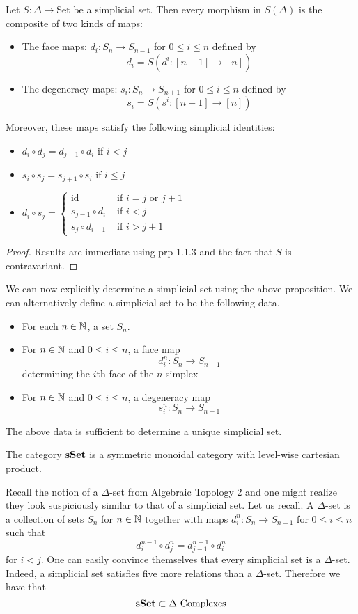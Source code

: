 \documentclass[a4paper]{article}
\begin{document}
\begin{prp}{}{} Let $S:\Delta\to\text{Set}$ be a simplicial set. Then every morphism in $S(\Delta)$ is the composite of two kinds of maps: 
\begin{itemize}
\item The face maps: $d_i:S_n\to S_{n-1}$ for $0\leq i\leq n$ defined by $$d_i=S(d^i:[n-1]\to[n])$$
\item The degeneracy maps: $s_i:S_n\to S_{n+1}$ for $0\leq i\leq n$ defined by $$s_i=S(s^i:[n+1]\to[n])$$
\end{itemize}
Moreover, these maps satisfy the following simplicial identities: 
\begin{itemize}
\item $d_i\circ d_j=d_{j-1}\circ d_i$ if $i<j$
\item $s_i\circ s_j=s_{j+1}\circ s_i$ if $i\leq j$
\item $d_i\circ s_j=\begin{cases}
\text{id} & \text{ if } i=j\text{ or }j+1\\
s_{j-1}\circ d_i & \text{ if } i<j\\
s_j\circ d_{i-1} & \text{ if }i>j+1
\end{cases}$
\end{itemize} \tcbline
\begin{proof}
Results are immediate using prp 1.1.3 and the fact that $S$ is contravariant. 
\end{proof}
\end{prp}

We can now explicitly determine a simplicial set using the above proposition. We can alternatively define a simplicial set to be the following data. 
\begin{itemize}
\item For each $n\in\mathbb{N}$, a set $S_n$. 
\item For $n\in\mathbb{N}$ and $0\leq i\leq n$, a face map $$d_i^n:S_n\to S_{n-1}$$ determining the $i$th face of the $n$-simplex
\item For $n\in\mathbb{N}$ and $0\leq i\leq n$, a degeneracy map $$s_i^n:S_n\to S_{n+1}$$
\end{itemize}

The above data is sufficient to determine a unique simplicial set. 

\begin{prp}{}{} The category $\bold{sSet}$ is a symmetric monoidal category with level-wise cartesian product. 
\end{prp}

Recall the notion of a $\Delta$-set from Algebraic Topology 2 and one might realize they look suspiciously similar to that of a simplicial set. Let us recall. A $\Delta$-set is a collection of sets $S_n$ for $n\in\mathbb{N}$ together with maps $d_i^n:S_n\to S_{n-1}$ for $0\leq i\leq n$ such that $$d_i^{n-1}\circ d_j^n=d_{j-1}^{n-1}\circ d_i^n$$ for $i<j$. One can easily convince themselves that every simplicial set is a $\Delta$-set. Indeed, a simplicial set satisfies five more relations than a $\Delta$-set. Therefore we have that $$\bold{sSet}\subset\Delta\text{ Complexes}$$
\end{document}
